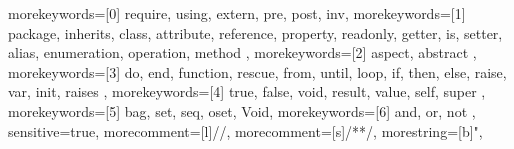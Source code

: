 \usepackage{listings}


 { morekeywords=[0]{ require, using,
extern, pre, post, inv}, morekeywords=[1]{ package, inherits, class,
attribute, reference, property, readonly, getter, is, setter, alias,
enumeration, operation, method }, morekeywords=[2]{ aspect, abstract
}, morekeywords=[3]{ do, end, function, rescue, from, until, loop,
if, then, else, raise, var, init, raises }, morekeywords=[4]{ true,
false, void, result, value, self, super }, morekeywords=[5]{ bag,
set, seq, oset, Void}, morekeywords=[6]{ and, or, not },
sensitive=true, morecomment=[l]{//}, morecomment=[s]{/*}{*/},
morestring=[b]", }


\newcommand{\noniso}{~\substack{\sqsubset\\ \sim}~}
\newcommand{\partialnoniso}[1]{~\substack{\sqsubset\\ \sim}_#1~}
\newcommand{\match}{\mbox{~<\#~}}
\newcommand{\deftitle}[1]{\emph{\textbf{(#1)}}}

\newcommand{\ie}{\emph{i.e.}, }
\newcommand{\eg}{\emph{e.g.}, }
\newcommand{\etal}{\emph{et al.} }